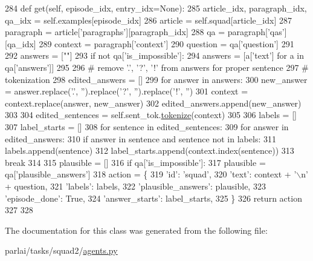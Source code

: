 \begin{DoxyCode}
284     \textcolor{keyword}{def }get(self, episode\_idx, entry\_idx=None):
285         article\_idx, paragraph\_idx, qa\_idx = self.examples[episode\_idx]
286         article = self.squad[article\_idx]
287         paragraph = article[\textcolor{stringliteral}{'paragraphs'}][paragraph\_idx]
288         qa = paragraph[\textcolor{stringliteral}{'qas'}][qa\_idx]
289         context = paragraph[\textcolor{stringliteral}{'context'}]
290         question = qa[\textcolor{stringliteral}{'question'}]
291 
292         answers = [\textcolor{stringliteral}{""}]
293         \textcolor{keywordflow}{if} \textcolor{keywordflow}{not} qa[\textcolor{stringliteral}{'is\_impossible'}]:
294             answers = [a[\textcolor{stringliteral}{'text'}] \textcolor{keywordflow}{for} a \textcolor{keywordflow}{in} qa[\textcolor{stringliteral}{'answers'}]]
295 
296         \textcolor{comment}{# remove '.', '?', '!' from answers for proper sentence}
297         \textcolor{comment}{# tokenization}
298         edited\_answers = []
299         \textcolor{keywordflow}{for} answer \textcolor{keywordflow}{in} answers:
300             new\_answer = answer.replace(\textcolor{stringliteral}{'.'}, \textcolor{stringliteral}{''}).replace(\textcolor{stringliteral}{'?'}, \textcolor{stringliteral}{''}).replace(\textcolor{stringliteral}{'!'}, \textcolor{stringliteral}{''})
301             context = context.replace(answer, new\_answer)
302             edited\_answers.append(new\_answer)
303 
304         edited\_sentences = self.sent\_tok.\hyperlink{namespaceparlai_1_1agents_1_1tfidf__retriever_1_1build__tfidf_a1fdb457e98eb4e4c26047e229686a616}{tokenize}(context)
305 
306         labels = []
307         label\_starts = []
308         \textcolor{keywordflow}{for} sentence \textcolor{keywordflow}{in} edited\_sentences:
309             \textcolor{keywordflow}{for} answer \textcolor{keywordflow}{in} edited\_answers:
310                 \textcolor{keywordflow}{if} answer \textcolor{keywordflow}{in} sentence \textcolor{keywordflow}{and} sentence \textcolor{keywordflow}{not} \textcolor{keywordflow}{in} labels:
311                     labels.append(sentence)
312                     label\_starts.append(context.index(sentence))
313                     \textcolor{keywordflow}{break}
314 
315         plausible = []
316         \textcolor{keywordflow}{if} qa[\textcolor{stringliteral}{'is\_impossible'}]:
317             plausible = qa[\textcolor{stringliteral}{'plausible\_answers'}]
318         action = \{
319             \textcolor{stringliteral}{'id'}: \textcolor{stringliteral}{'squad'},
320             \textcolor{stringliteral}{'text'}: context + \textcolor{stringliteral}{'\(\backslash\)n'} + question,
321             \textcolor{stringliteral}{'labels'}: labels,
322             \textcolor{stringliteral}{'plausible\_answers'}: plausible,
323             \textcolor{stringliteral}{'episode\_done'}: \textcolor{keyword}{True},
324             \textcolor{stringliteral}{'answer\_starts'}: label\_starts,
325         \}
326         \textcolor{keywordflow}{return} action
327 
328 
\end{DoxyCode}


The documentation for this class was generated from the following file\+:\begin{DoxyCompactItemize}
\item 
parlai/tasks/squad2/\hyperlink{parlai_2tasks_2squad2_2agents_8py}{agents.\+py}\end{DoxyCompactItemize}
